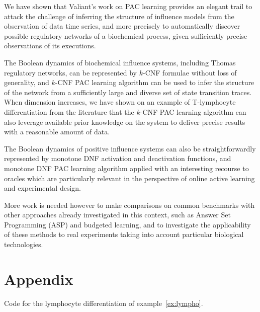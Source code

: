 \documentclass{llncs}
\begin{document}
We have shown that Valiant's work on PAC learning provides an elegant trail 
to attack the challenge of inferring the structure of influence models from the observation of data time series,
and more precisely to automatically discover possible regulatory networks of a biochemical process, given sufficiently precise observations of its executions.

The Boolean dynamics of biochemical influence systems, including Thomas regulatory networks, can be represented by $k$-CNF formulae without loss of generality,
and $k$-CNF PAC learning algorithm can be used to infer the structure of the network from
a sufficiently large and diverse set of state transition traces.
When dimension increases, we have shown on an example of T-lymphocyte differentiation from the literature
that the $k$-CNF PAC learning algorithm can also leverage available
prior knowledge on the system to deliver precise results with a reasonable
amount of data.

The Boolean dynamics of positive influence systems can also be straightforwardly represented by monotone DNF activation and deactivation functions,
and monotone DNF PAC learning algorithm applied with an interesting recourse to oracles 
which are particularly relevant in the perspective of online active learning and experimental design.

More work is needed however to make comparisons on common benchmarks
with  other approaches already investigated in this context, such as Answer Set Programming (ASP) and budgeted learning,
and to investigate the applicability of these methods to real experiments taking into account particular biological technologies.



\newpage
\section*{Appendix}
\begin{listfig}[H]

\caption{Code for the lymphocyte differentiation of example~\ref{ex:lympho}.\label{bool-lympho}}
\end{listfig}
\end{document}
